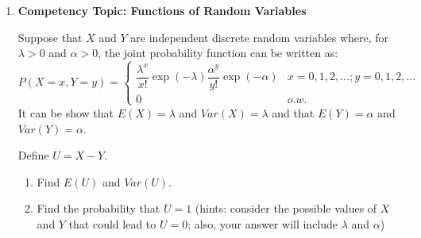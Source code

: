 \documentclass[11pt]{article}
\providecommand{\tightlist}{%
  \setlength{\itemsep}{0pt}\setlength{\parskip}{0pt}}
\begin{document}
\newpage

\begin{enumerate}
\def\labelenumi{\arabic{enumi}.}
\setcounter{enumi}{3}
\item
  \textbf{Competency Topic: Functions of Random Variables}

  Suppose that \(X\) and \(Y\) are independent discrete random variables
  where, for \(\lambda > 0\) and \(\alpha > 0\), the joint probability
  function can be written as:
  \[P(X=x, Y=y) = \begin{cases} \dfrac{\lambda^x}{x!} \exp\left(-\lambda\right) \dfrac{\alpha^y}{y!} \exp\left(-\alpha\right) & x = 0, 1, 2, ...; y = 0, 1, 2, ... \\ 0 & o.w. \end{cases}\]
  It can be show that \(E(X) = \lambda\) and \(Var(X) = \lambda\) and
  that \(E(Y) = \alpha\) and \(Var(Y) = \alpha\).

  Define \(U = X - Y\).

  \begin{enumerate}
  \def\labelenumii{\alph{enumii}.}
  \tightlist
  \item
    Find \(E(U)\) and \(Var(U)\). \vspace{3cm}
  \item
    Find the probability that \(U = 1\) (hints: consider the possible
    values of \(X\) and \(Y\) that could lead to \(U = 0\); also, your
    answer will include \(\lambda\) and \(\alpha\))
  \end{enumerate}
\end{enumerate}
\end{document}

